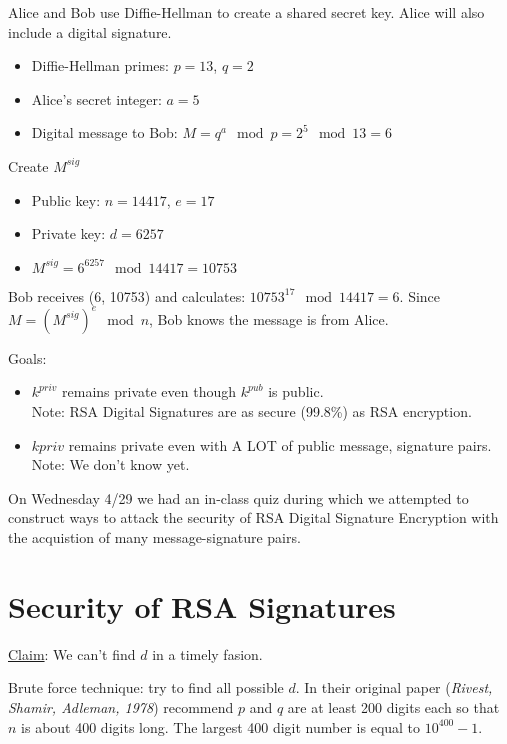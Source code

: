 \begin{example}
Alice and Bob use Diffie-Hellman to create a shared secret key. Alice will also include a digital signature.
\begin{itemize}
\item Diffie-Hellman primes: $p=13$, $q=2$
\item Alice's secret integer: $a=5$
\item Digital message to Bob: $ M = q^{a}\mod{p} = 2^{5}\mod{13} = 6$
\end{itemize}

Create $M^{sig}$
\begin{itemize}
\item Public key: $n = 14417$, $e = 17$
\item Private key: $d = 6257$
\item $M^{sig} = 6^{6257} \mod{14417 = 10753}$

\end{itemize}

Bob receives (6, 10753) and calculates:
$10753^{17}\mod{14417} = 6$.
Since $M = (M^{sig})^{e} \mod{n}$, Bob knows the message is from Alice. 
\end{example}

Goals: 
\begin{itemize}
\item $k^{priv}$ remains private even though $k^{pub}$ is public.\\
Note: RSA Digital Signatures are as secure (99.8\%) as RSA encryption.
\item $k{priv}$ remains private even with A LOT of public message, signature pairs.\\
Note: We don't know yet.
\end{itemize}




On Wednesday 4/29 we had an in-class quiz during which we attempted to construct ways to attack the security of RSA Digital Signature Encryption with the acquistion of many message-signature pairs.\\
\section{Security of RSA Signatures}

\underline{Claim}: We can't find $d$ in a timely fasion. 

Brute force technique: try to find all possible $d$.
In their original paper (\textit{Rivest, Shamir, Adleman, 1978}) recommend $p$ and $q$ are at least 200 digits each so that $n$ is about 400 digits long. The largest 400 digit number is equal to $10^{400}-1$.\\


